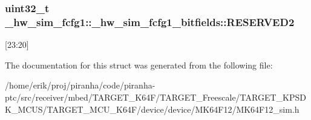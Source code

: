\subsubsection[{\texorpdfstring{R\+E\+S\+E\+R\+V\+E\+D2}{RESERVED2}}]{\setlength{\rightskip}{0pt plus 5cm}uint32\+\_\+t \+\_\+hw\+\_\+sim\+\_\+fcfg1\+::\+\_\+hw\+\_\+sim\+\_\+fcfg1\+\_\+bitfields\+::\+R\+E\+S\+E\+R\+V\+E\+D2}\hypertarget{struct__hw__sim__fcfg1_1_1__hw__sim__fcfg1__bitfields_a3b919aa023e571dbac99cf72990ccc6f}{}\label{struct__hw__sim__fcfg1_1_1__hw__sim__fcfg1__bitfields_a3b919aa023e571dbac99cf72990ccc6f}
\mbox{[}23\+:20\mbox{]} 

The documentation for this struct was generated from the following file\+:\begin{DoxyCompactItemize}
\item 
/home/erik/proj/piranha/code/piranha-\/ptc/src/receiver/mbed/\+T\+A\+R\+G\+E\+T\+\_\+\+K64\+F/\+T\+A\+R\+G\+E\+T\+\_\+\+Freescale/\+T\+A\+R\+G\+E\+T\+\_\+\+K\+P\+S\+D\+K\+\_\+\+M\+C\+U\+S/\+T\+A\+R\+G\+E\+T\+\_\+\+M\+C\+U\+\_\+\+K64\+F/device/device/\+M\+K64\+F12/M\+K64\+F12\+\_\+sim.\+h\end{DoxyCompactItemize}
